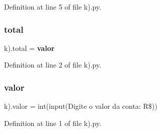 Definition at line 5 of file k).\+py.

\mbox{\label{namespacek_08_a67bf9bd56bfa13ea764aa2ce0d7fc6a9}} 
\subsubsection{total}
{\footnotesize\ttfamily k).total = \textbf{ valor}}



Definition at line 2 of file k).\+py.

\mbox{\label{namespacek_08_a177d25ce2ecbb32ae4a294d696035a8a}} 
\subsubsection{valor}
{\footnotesize\ttfamily k).valor = int(input(\textquotesingle{}Digite o valor da conta\+: R\$\textquotesingle{}))}



Definition at line 1 of file k).\+py.

